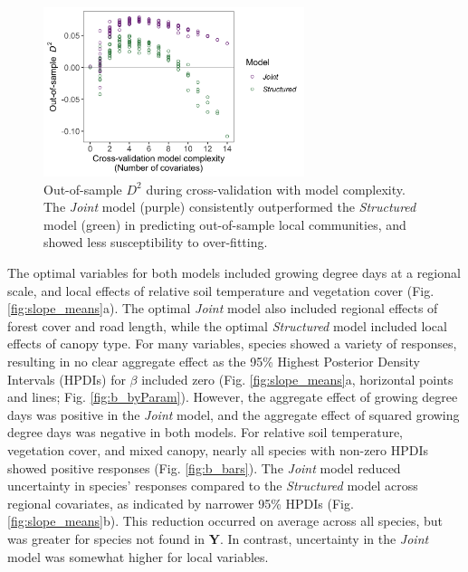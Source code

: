 \documentclass[preprint,final,times,12pt,3p]{elsarticle}
\begin{document}
\begin{figure}
	\centering\includegraphics[width=3in]{../../../ms/1_Ecography/1/figs/crossvalidation.png}
	\caption{\label{fig:cross-validation} Out-of-sample $D^2$ during cross-validation with model complexity. The \emph{Joint} model (purple) consistently outperformed the \emph{Structured} model (green) in predicting out-of-sample local communities, and showed less susceptibility to over-fitting.  }
\end{figure}

The optimal variables for both models included growing degree days at a regional scale, and local effects of relative soil temperature and vegetation cover (Fig. \ref{fig:slope_means}a). The optimal \emph{Joint} model also included regional effects of forest cover and road length, while the optimal \emph{Structured} model included local effects of canopy type. For many variables, species showed a variety of responses, resulting in no clear aggregate effect as the 95\% Highest Posterior Density Intervals (HPDIs) for $\beta$ included zero (Fig. \ref{fig:slope_means}a, horizontal points and lines; Fig. \ref{fig:b_byParam}). However, the aggregate effect of growing degree days was positive in the \emph{Joint} model, and the aggregate effect of squared growing degree days was negative in both models. For relative soil temperature, vegetation cover, and mixed canopy, nearly all species with non-zero HPDIs showed positive responses (Fig. \ref{fig:b_bars}). The \emph{Joint} model reduced uncertainty in species' responses compared to the \emph{Structured} model across regional covariates, as indicated by narrower 95\% HPDIs (Fig. \ref{fig:slope_means}b). This reduction occurred on average across all species, but was greater for species not found in \textbf{Y}. In contrast, uncertainty in the \emph{Joint} model was somewhat higher for local variables.
\end{document}
